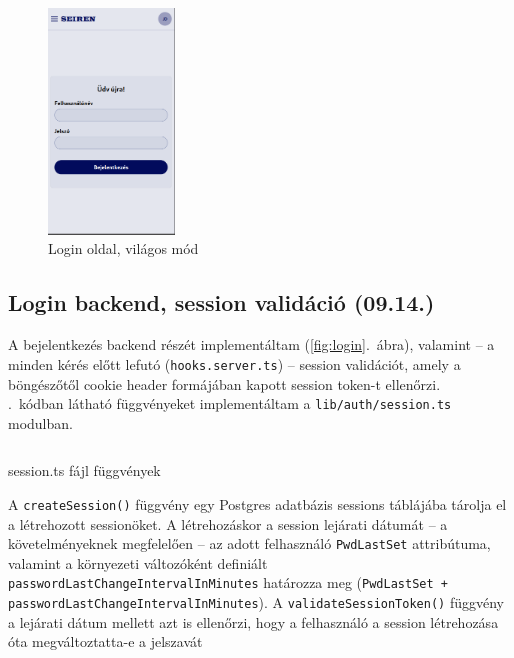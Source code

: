 \documentclass[a4paper]{article}
\newcommand{\inlts}[1]{\texttt{#1}}
\newcommand{\inltxt}[1]{\texttt{#1}}
\begin{document}
\begin{figure}[ht]
  \centering
  \includegraphics[clip, trim=0 10 1 0, width = 0.3\textwidth]{images/login_page.png}
  \caption{Login oldal, világos mód}
  \label{fig:login_page}
\end{figure}

\subsection{Login backend, session validáció (09.14.)}

A bejelentkezés backend részét implementáltam (\ref{fig:login}.~ábra), valamint – a minden
kérés előtt lefutó (\inlts{hooks.server.ts}) – session validációt, amely a böngészőtől cookie
header formájában kapott session token-t ellenőrzi. \\

.~kódban látható függvényeket implementáltam a \inltxt{lib/auth/session.ts} modulban.

\begin{listing}[!ht]
\inputminted[bgcolor=codebg, breaklines, breakanywhere, fontsize=\small]{typescript}{code/session.ts}
\caption{session.ts fájl függvények}
\label{listing:session}
\end{listing}

A \inlts{createSession()} függvény egy Postgres adatbázis sessions táblájába tárolja el a
létrehozott sessionöket. A létrehozáskor a session lejárati dátumát – a követelményeknek
megfelelően – az adott felhasználó \inlts{PwdLastSet} attribútuma, valamint a környezeti változóként
definiált \inlts{passwordLastChangeIntervalInMinutes} határozza meg
(\inlts{PwdLastSet + passwordLastChangeIntervalInMinutes}). A \inlts{validateSessionToken()} függvény a lejárati dátum mellett
azt is ellenőrzi, hogy a felhasználó a session létrehozása óta megváltoztatta-e a
jelszavát
\end{document}
